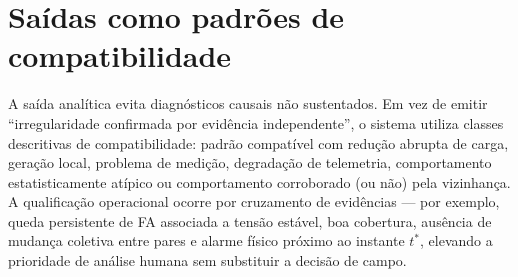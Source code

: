 \section{Saídas como padrões de compatibilidade}\label{sauxeddas-como-padruxf5es-de-compatibilidade}

A saída analítica evita diagnósticos causais não sustentados. Em vez de emitir ``irregularidade confirmada por evidência independente'', o sistema utiliza classes descritivas de compatibilidade: padrão compatível com redução abrupta de carga, geração local, problema de medição, degradação de telemetria, comportamento estatisticamente atípico ou comportamento corroborado (ou não) pela vizinhança. A qualificação operacional ocorre por cruzamento de evidências --- por exemplo, queda persistente de FA associada a tensão estável, boa cobertura, ausência de mudança coletiva entre pares e alarme físico próximo ao instante $t^*$, elevando a prioridade de análise humana sem substituir a decisão de campo.
